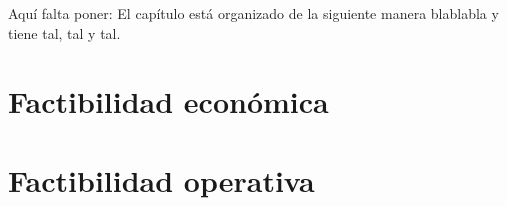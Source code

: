 Aquí falta poner: El capítulo está organizado de la siguiente manera blablabla y tiene tal, tal y tal.


\section{Factibilidad económica}


\section{Factibilidad operativa}
